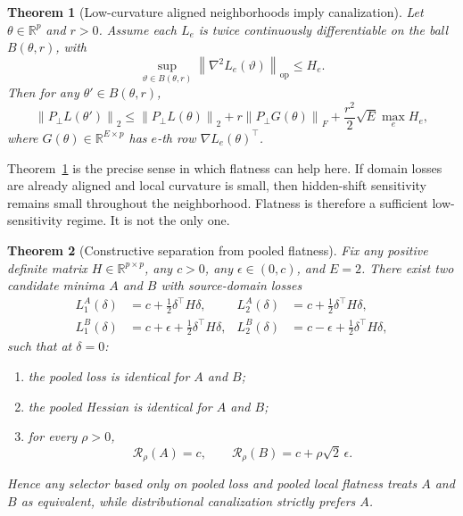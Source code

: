 \documentclass{article}
\newtheorem{theorem}{Theorem}[section]
\theoremstyle{definition}
\newcommand{\RR}{\mathbb{R}}
\newcommand{\norm}[1]{\left\lVert #1 \right\rVert}
\begin{document}
\begin{theorem}[Low-curvature aligned neighborhoods imply canalization]
\label{thm:flatness_corollary}
Let \(\theta\in\RR^p\) and \(r>0\). Assume each \(L_e\) is twice continuously differentiable on the ball \(B(\theta,r)\), with
\[
\sup_{\vartheta \in B(\theta,r)} \norm{\nabla^2 L_e(\vartheta)}_{\mathrm{op}} \le H_e.
\]
Then for any \(\theta' \in B(\theta,r)\),
\begin{equation}
\norm{P_\perp L(\theta')}_2
\le
\norm{P_\perp L(\theta)}_2
+ r \norm{P_\perp G(\theta)}_F
+ \frac{r^2}{2}\sqrt{E}\max_{e} H_e,
\label{eq:flatness_bound}
\end{equation}
where \(G(\theta)\in\RR^{E\times p}\) has \(e\)-th row \(\nabla L_e(\theta)^\top\).
\end{theorem}

Theorem~\ref{thm:flatness_corollary} is the precise sense in which flatness can help here. If domain losses are already aligned and local curvature is small, then hidden-shift sensitivity remains small throughout the neighborhood. Flatness is therefore a sufficient low-sensitivity regime. It is not the only one.

\begin{theorem}[Constructive separation from pooled flatness]
\label{thm:separation}
Fix any positive definite matrix \(H\in\RR^{p\times p}\), any \(c>0\), any \(\epsilon \in (0,c)\), and \(E=2\). There exist two candidate minima \(A\) and \(B\) with source-domain losses
\begin{align}
L_1^{A}(\delta)&=c+\frac{1}{2}\delta^\top H \delta, &
L_2^{A}(\delta)&=c+\frac{1}{2}\delta^\top H \delta, \nonumber\\
L_1^{B}(\delta)&=c+\epsilon+\frac{1}{2}\delta^\top H \delta, &
L_2^{B}(\delta)&=c-\epsilon+\frac{1}{2}\delta^\top H \delta,
\label{eq:separation_losses}
\end{align}
such that at \(\delta=0\):
\begin{enumerate}[leftmargin=1.3em]
    \item the pooled loss is identical for \(A\) and \(B\);
    \item the pooled Hessian is identical for \(A\) and \(B\);
    \item for every \(\rho>0\),
    \[
    \mathcal R_\rho(A)=c,
    \qquad
    \mathcal R_\rho(B)=c+\rho\sqrt{2}\,\epsilon.
    \]
\end{enumerate}
Hence any selector based only on pooled loss and pooled local flatness treats \(A\) and \(B\) as equivalent, while distributional canalization strictly prefers \(A\).
\end{theorem}
\end{document}
